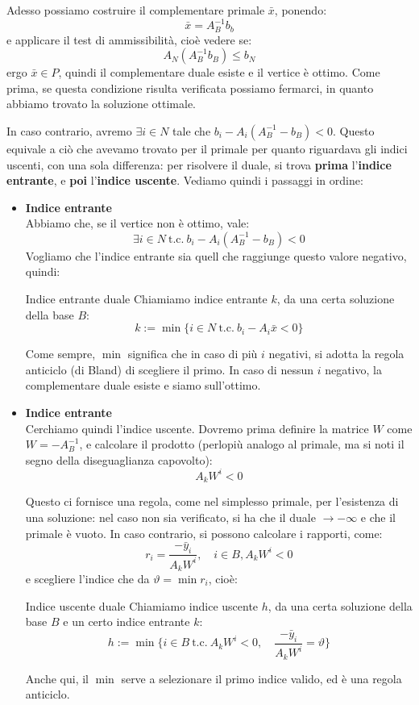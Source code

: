 \documentclass[a4paper,11pt]{article}
\begin{document}
Adesso possiamo costruire il complementare primale $\bar{x}$, ponendo:
$$
\bar{x} = A_B^{-1}b_b 
$$
e applicare il test di ammissibilità, cioè vedere se:
$$
A_N(A_B^{-1} b_B) \leq b_N
$$
ergo $\bar{x} \in P$, quindi il complementare duale esiste e il vertice è ottimo.
Come prima, se questa condizione risulta verificata possiamo fermarci, in quanto abbiamo trovato la soluzione ottimale.

In caso contrario, avremo $\exists i \in N$ tale che $b_i - A_i (A_B^{-1} - b_B) < 0$.
Questo equivale a ciò che avevamo trovato per il primale per quanto riguardava gli indici uscenti, con una sola differenza: per risolvere il duale, si trova \textbf{prima} l'\textbf{indice entrante}, e \textbf{poi} l'\textbf{indice uscente}.
Vediamo quindi i passaggi in ordine:

\begin{itemize}
	\item \textbf{\textsf{Indice entrante}} \\
Abbiamo che, se il vertice non è ottimo, vale:
$$
\exists i \in N \ \text{t.c.} \ b_i - A_i (A_B^{-1} - b_B) < 0
$$
Vogliamo che l'indice entrante sia quell che raggiunge questo valore negativo, quindi:
\begin{definition}{Indice entrante duale}
Chiamiamo indice entrante $k$, da una certa soluzione della base $B$:
$$k := \min\{ i \in N \ \text{t.c.} \ b_i - A_i \bar{x} < 0 \}$$
\end{definition}
Come sempre, $\min$ significa che in caso di più $i$ negativi, si adotta la regola anticiclo (di Bland) di scegliere il primo.
In caso di nessun $i$ negativo, la complementare duale esiste e siamo sull'ottimo.

	\item \textbf{\textsf{Indice entrante}} \\
Cerchiamo quindi l'indice uscente.
Dovremo prima definire la matrice $W$ come $ W = -A_B^{-1}$, e  calcolare il prodotto (perlopiù analogo al primale, ma si noti il segno della diseguaglianza capovolto):
$$ 
A_k W^i < 0
$$

Questo ci fornisce una regola, come nel simplesso primale, per l'esistenza di una soluzione: nel caso non sia verificato, si ha che il duale $\rightarrow -\infty$ e che il primale è vuoto.
In caso contrario, si possono calcolare i rapporti, come:
$$
r_i = \frac{-\bar{y}_i}{A_kW^i}, \quad i \in B, A_k W^i < 0
$$
e scegliere l'indice che da $\vartheta = \min{r_i}$, cioè:
\begin{definition}{Indice uscente duale}
	Chiamiamo indice uscente $h$, da una certa soluzione della base $B$ e un certo indice entrante $k$:
	$$
	h := \min\{ i \in B \ \text{t.c.} \ A_k W^i < 0, \quad \frac{-\bar{y}_i}{A_kW^i} = \vartheta \}	
	$$
\end{definition}
Anche qui, il $\min$ serve a selezionare il primo indice valido, ed è una regola anticiclo.
\end{itemize}
\end{document}
